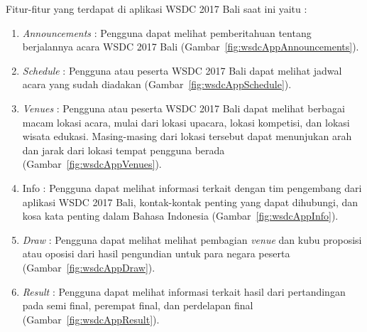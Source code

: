 Fitur-fitur yang terdapat di aplikasi WSDC 2017 Bali saat ini yaitu :

\begin{enumerate}
	\item {\it Announcements} : Pengguna dapat melihat pemberitahuan tentang berjalannya acara WSDC 2017 Bali (Gambar~\ref{fig:wsdcAppAnnouncements}).

	\item {\it Schedule} : Pengguna atau peserta WSDC 2017 Bali dapat melihat jadwal acara yang sudah diadakan (Gambar~\ref{fig:wsdcAppSchedule}).

	\item {\it Venues} : Pengguna atau peserta WSDC 2017 Bali dapat melihat berbagai macam lokasi acara, mulai dari lokasi upacara, lokasi kompetisi, dan lokasi wisata edukasi. Masing-masing dari lokasi tersebut dapat menunjukan arah dan jarak dari lokasi tempat pengguna berada (Gambar~\ref{fig:wsdcAppVenues}).

	\item Info : Pengguna dapat melihat informasi terkait dengan tim pengembang dari aplikasi WSDC 2017 Bali, kontak-kontak penting yang dapat dihubungi, dan kosa kata penting dalam Bahasa Indonesia (Gambar~\ref{fig:wsdcAppInfo}).

	\item {\it Draw} : Pengguna dapat melihat melihat pembagian {\it venue} dan kubu proposisi atau oposisi dari hasil pengundian untuk para negara peserta (Gambar~\ref{fig:wsdcAppDraw}).

	\item {\it Result} : Pengguna dapat melihat informasi terkait hasil dari pertandingan pada semi final, perempat final, dan perdelapan final (Gambar~\ref{fig:wsdcAppResult}).
\end{enumerate}

